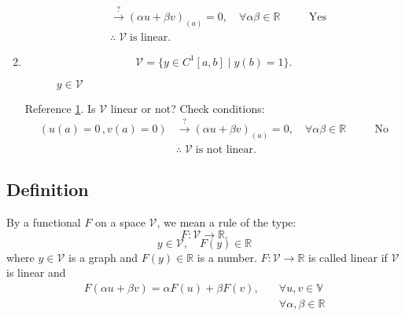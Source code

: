 \documentclass[12pt,twoside]{article}
\begin{document}
\begin{enumerate}
\begin{align*}
    &\stackrel{?}{\longrightarrow} (\alpha u+\beta
    v)_{(a)}=0,\quad \forall \alpha\beta\in\mathbb{R} &\quad &\text{Yes}\\
    &\therefore\; \mathcal{V}\;\text{is linear.}
  \end{align*}
\item
  \begin{equation*}
    \mathcal{V} = \{y\in C^1[a,b]\;|\;y(b)=1\}.
  \end{equation*}
    \begin{figure}[ht]
    \centering
    \caption{$y\in \mathcal{V}$}
    \label{fig:v-equation-2}
  \end{figure}
  Reference \cref{fig:v-equation-2}. Is $\mathcal{V}$ linear or not? Check conditions:
  \begin{align*}
    (u(a)=0\,,v(a)=0)
    &\stackrel{?}{\longrightarrow} (\alpha u+\beta
    v)_{(a)}=0,\quad \forall \alpha\beta\in\mathbb{R} &\quad &\text{No}\\
    &\therefore\; \mathcal{V}\;\text{is not linear.}
  \end{align*}
\end{enumerate}
\subsection{Definition}
By a functional $F$ on a space $\mathcal{V}$, we mean a rule of the type:
\begin{equation*}
  F: \mathcal{V} \rightarrow \mathbb{R}.
\end{equation*}
\begin{equation*}
  y\in\mathcal{V},\quad F(y)\in\mathbb{R}
\end{equation*}
where $y\in\mathcal{V}$ is a graph and $F(y)\in\mathbb{R}$ is a number.
$F:\mathcal{V}\rightarrow\mathbb{R}$ is called linear if $\mathcal{V}$ is linear
and
\begin{align*}
  F(\alpha u+\beta v) = \alpha F(u) + \beta F(v), &\quad \forall u,v\in\mathbb{V} \\
                                                  &\quad \forall \alpha,\beta\in\mathbb{R} \\
\end{align*}
\end{document}
